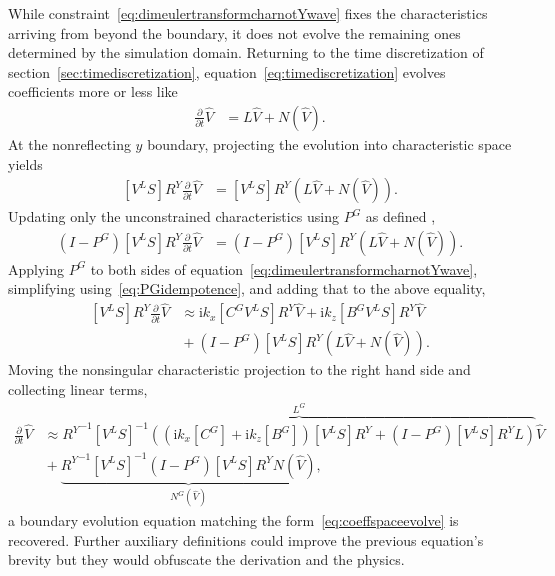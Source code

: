 \documentclass[letterpaper,11pt,nointlimits,reqno,draft]{amsart}
\newcommand{\ii}{\ensuremath{\mathrm{i}}}
\begin{document}
While constraint~\eqref{eq:dimeulertransformcharnotYwave} fixes the
characteristics arriving from beyond the boundary, it does not evolve the
remaining ones determined by the simulation domain.  Returning to the time
discretization of section~\ref{sec:timediscretization},
equation~\eqref{eq:timediscretization} evolves coefficients more or less like
\begin{align}
\label{eq:coeffspaceevolve}
  \frac{\partial}{\partial{}t} \hat{V} &= L \hat{V} + N(\hat{V})
  .
\end{align}
At the nonreflecting $y$ boundary, projecting the evolution into characteristic
space yields
\begin{align}
  \left[V^L S\right] R^Y
  \frac{\partial}{\partial{}t} \hat{V} &=
  \left[V^L S\right] R^Y
  \left(
    L \hat{V}
    +
    N(\hat{V})
  \right)
  .
\end{align}
Updating only the unconstrained characteristics using $P^G$ as defined
,
\begin{align}
  \left(I - P^G\right)
  \left[V^L S\right] R^Y
  \frac{\partial}{\partial{}t} \hat{V}
&=
  \left(I - P^G\right)
  \left[V^L S\right] R^Y
  \left(
    L \hat{V}
    +
    N(\hat{V})
  \right)
  .
\end{align}
Applying $P^G$ to both sides of
equation~\eqref{eq:dimeulertransformcharnotYwave}, simplifying
using~\eqref{eq:PGidempotence}, and adding that to the above equality,
\begin{align}
  \left[V^L S\right]
  R^Y
  \frac{\partial}{\partial{}t}
  \hat{V}
&\approx
  \ii k_x
  \left[C^G V^L S\right]
  R^Y
  \hat{V}
  +
  \ii k_z
  \left[B^G V^L S\right]
  R^Y
  \hat{V}
\\
&{}+
  \left(I - P^G\right)
  \left[V^L S\right] R^Y
  \left(
    L \hat{V}
    +
    N(\hat{V})
  \right)
.
\end{align}
Moving the nonsingular characteristic projection to the right hand side and
collecting linear terms,
\begin{align}
\label{eq:dimeulertransformevolve}
  \frac{\partial}{\partial{}t}
  \hat{V}
&\approx
\overbrace{
  {R^Y}^{-1}
  \left[V^L S\right]^{-1}
  \left(
    \left( \ii k_x \left[C^G\right] + \ii k_z \left[B^G\right] \right)
    \left[V^L S\right] R^Y
    +
    \left(I-P^G\right)
    \left[V^L S\right] R^Y
    L
  \right)
}^{L^G}
  \hat{V}
\\
&{}+
\underbrace{
  {R^Y}^{-1}
  \left[V^L S\right]^{-1}
  \left(I - P^G\right)
  \left[V^L S\right] R^Y
  N(\hat{V})
}_{N^G\left(\hat{V}\right)}
,
\end{align}
a boundary evolution equation matching the form~\eqref{eq:coeffspaceevolve} is
recovered.  Further auxiliary definitions could improve the previous equation's
brevity but they would obfuscate the derivation and the physics.
\end{document}
